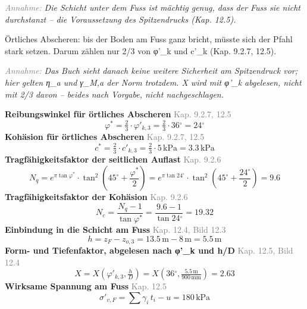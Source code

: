 \documentclass[11pt,a4paper]{article}
\newcommand{\normref}[1]{{\small\textcolor{gray}{#1}}}
\newcommand{\hinweis}[2]{\par\noindent\textcolor{gray}{\textit{#1:}} \textit{#2}\par}
\begin{document}
\hinweis{Annahme}{Die Schicht unter dem Fuss ist mächtig genug, dass der Fuss sie nicht durchstanzt – die Voraussetzung des Spitzendrucks (Kap. 12.5).}
Örtliches Abscheren: bis der Boden am Fuss ganz bricht, müsste sich der Pfahl stark setzen. Darum zählen nur 2/3 von φ'\_k und c'\_k (Kap. 9.2.7, 12.5).

\hinweis{Annahme}{Das Buch sieht danach keine weitere Sicherheit am Spitzendruck vor; hier gelten η\_a und γ\_M,a der Norm trotzdem. X wird mit φ'\_k abgelesen, nicht mit 2/3 davon – beides nach Vorgabe, nicht nachgeschlagen.}
\noindent\textbf{Reibungswinkel für örtliches Abscheren} \hfill \normref{Kap. 9.2.7, 12.5}
\begin{equation*}
\varphi^{*} = \tfrac{2}{3} \cdot \varphi'_{k,3} = \tfrac{2}{3} \cdot 36{}^{\circ} = 24{}^{\circ}
\end{equation*}
\noindent\textbf{Kohäsion für örtliches Abscheren} \hfill \normref{Kap. 9.2.7, 12.5}
\begin{equation*}
c^{*} = \tfrac{2}{3} \cdot c'_{k,3} = \tfrac{2}{3} \cdot 5\,\mathrm{kPa} = 3.3\,\mathrm{kPa}
\end{equation*}
\noindent\textbf{Tragfähigkeitsfaktor der seitlichen Auflast} \hfill \normref{Kap. 9.2.6}
\begin{equation*}
N_q = e^{\pi \tan \varphi^{*}} \cdot \tan^{2}\left(45^\circ + \frac{\varphi^{*}}{2}\right) = e^{\pi \tan 24{}^{\circ}} \cdot \tan^{2}\left(45^\circ + \frac{24{}^{\circ}}{2}\right) = 9.6
\end{equation*}
\noindent\textbf{Tragfähigkeitsfaktor der Kohäsion} \hfill \normref{Kap. 9.2.6}
\begin{equation*}
N_c = \frac{N_q - 1}{\tan \varphi^{*}} = \frac{9.6 - 1}{\tan 24{}^{\circ}} = 19.32
\end{equation*}
\noindent\textbf{Einbindung in die Schicht am Fuss} \hfill \normref{Kap. 12.4, Bild 12.3}
\begin{equation*}
h = z_F - z_{o,3} = 13.5\,\mathrm{m} - 8\,\mathrm{m} = 5.5\,\mathrm{m}
\end{equation*}
\noindent\textbf{Form- und Tiefenfaktor, abgelesen nach φ'\_k und h/D} \hfill \normref{Kap. 12.5, Bild 12.4}
\begin{equation*}
X = X\left(\varphi'_{k,3}, \tfrac{h}{D}\right) = X\left(36{}^{\circ}, \tfrac{5.5\,\mathrm{m}}{900\,\mathrm{mm}}\right) = 2.63
\end{equation*}
\noindent\textbf{Wirksame Spannung am Fuss} \hfill \normref{Kap. 12.5}
\begin{equation*}
\sigma'_{v,F} = \sum \gamma_i \, t_i - u = 180\,\mathrm{kPa}
\end{equation*}
\end{document}
